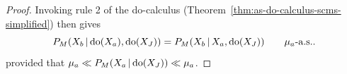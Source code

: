 \begin{proof}
Invoking rule 2 of the do-calculus (Theorem~\ref{thm:as-do-calculus-scms-simplified}) then gives 
  $$P_{M}(X_b \operatorname*{|} \operatorname{do}(X_a), \operatorname{do}(X_J)) = P_{M}(X_b \operatorname*{|} X_a, \operatorname{do}(X_J)) \qquad \mu_a\text{-a.s.}.$$
provided that $\mu_a \ll P_M(X_a \operatorname*{|} \operatorname{do}(X_J)) \ll \mu_a$.
\end{proof}
